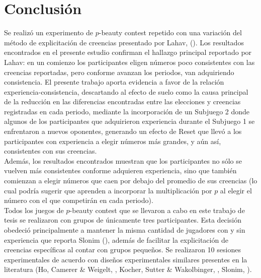 
\chapter{Conclusión} %

\label{Cap_Conclusion} %

Se realizó un experimento de $p$-beauty contest repetido con una variación del método de explicitación de creencias presentado por Lahav, (\citeyear{Lahav}). Los resultados encontrados en el presente estudio confirman el hallazgo principal reportado por Lahav: en un comienzo los participantes eligen números poco consistentes con las creencias reportadas, pero conforme avanzan los periodos, van adquiriendo consistencia. El presente trabajo aporta evidencia a favor de la relación experiencia-consistencia, descartando al efecto de suelo como la causa principal de la reducción en las diferencias encontradas entre las elecciones y creencias registradas en cada periodo, mediante la incorporación de un Subjuego 2 donde algunos de los participantes que adquirieron experiencia durante el Subjuego 1 se enfrentaron a nuevos oponentes, generando un efecto de Reset que llevó a los participantes con experiencia a elegir números más grandes, y aún así, consistentes con sus creencias.\\

Además, los resultados encontrados muestran que los participantes no sólo se vuelven más consistentes conforme adquieren experiencia, sino que también comienzan a elegir números que caen por debajo del promedio de sus creencias (lo cual podría sugerir que aprenden a incorporar la multiplicación por $p$ al elegir el número con el que competirán en cada periodo).\\

Todos los juegos de $p$-beauty contest que se llevaron a cabo en este trabajo de tesis se realizaron con grupos de únicamente tres participantes. Esta decisión obedeció principalmente a mantener la misma cantidad de jugadores con y sin experiencia que reporta Slonim (\citeyear{Slonim}), además de facilitar la explicitación de creencias específicas al contar con grupos pequeños. Se realizaron 10 sesiones experimentales de acuerdo con diseños experimentales similares presentes en la literatura (Ho, Camerer & Weigelt, \citeyear{Ho}, Kocher, Sutter & Wakolbinger, \citeyear{Kocher}, Slonim, \citeyear{Slonim}).\\ %

